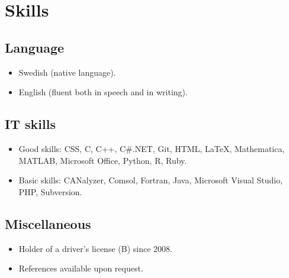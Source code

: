 \documentclass{skvitae}
\begin{document}
	\section{Skills}
	\subsection{Language}
	\begin{itemize}
		\item Swedish (native language).
		\item English (fluent both in speech and in writing).
	\end{itemize}

	\subsection{IT skills}
	\begin{itemize}
		\item Good skills: CSS, C, C++, C\#.NET, Git, HTML, \LaTeX, Mathematica, MATLAB, Microsoft Office, Python, R, Ruby.
		\item Basic skills: CANalyzer, Comsol, Fortran, Java, Microsoft Visual Studio, PHP, Subversion.
	\end{itemize}

	\subsection{Miscellaneous}
	\begin{itemize}
		\item Holder of a driver's license (B) since 2008.
		\item References available upon request.
	\end{itemize}
\end{document}
